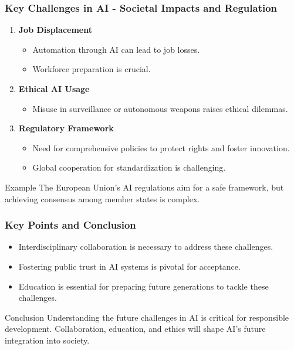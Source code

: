 \documentclass[aspectratio=169]{beamer}
\begin{document}
\begin{frame}[fragile]
    \frametitle{Key Challenges in AI - Societal Impacts and Regulation}
    \begin{enumerate}
        \item \textbf{Job Displacement}
        \begin{itemize}
            \item Automation through AI can lead to job losses.
            \item Workforce preparation is crucial.
        \end{itemize}
        
        \item \textbf{Ethical AI Usage}
        \begin{itemize}
            \item Misuse in surveillance or autonomous weapons raises ethical dilemmas.
        \end{itemize}
        
        \item \textbf{Regulatory Framework}
        \begin{itemize}
            \item Need for comprehensive policies to protect rights and foster innovation.
            \item Global cooperation for standardization is challenging.
        \end{itemize}
    \end{enumerate}
    
    \begin{block}{Example}
    The European Union’s AI regulations aim for a safe framework, but achieving consensus among member states is complex.
    \end{block}
\end{frame}

\begin{frame}[fragile]
    \frametitle{Key Points and Conclusion}
    \begin{itemize}
        \item Interdisciplinary collaboration is necessary to address these challenges.
        \item Fostering public trust in AI systems is pivotal for acceptance.
        \item Education is essential for preparing future generations to tackle these challenges.
    \end{itemize}
    
    \begin{block}{Conclusion}
    Understanding the future challenges in AI is critical for responsible development. Collaboration, education, and ethics will shape AI's future integration into society.
    \end{block}
\end{frame}
\end{document}
